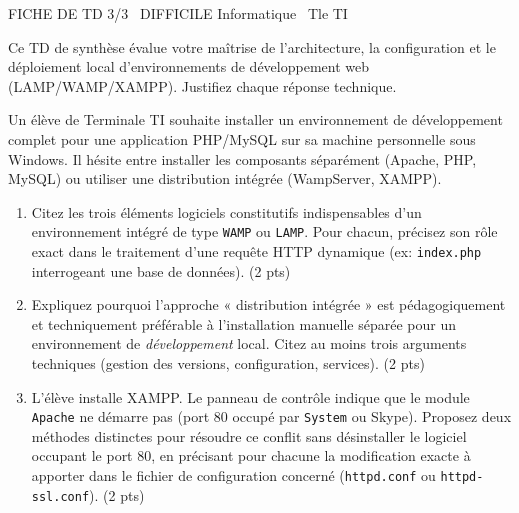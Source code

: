 \documentclass[11pt]{article}
\begin{document}
\begin{tcolorbox}[enhanced,colback=popink,colframe=popink,arc=10pt,boxrule=0pt,left=12pt,right=12pt,top=9pt,bottom=9pt]
{\color{white}\popxbold\small FICHE DE TD 3/3 \textbullet\ DIFFICILE \hfill Informatique \textbullet\ Tle TI\par}
\end{tcolorbox}
\vspace{4pt}
Ce TD de synthèse évalue votre maîtrise de l'architecture, la configuration et le déploiement local d'environnements de développement web (LAMP/WAMP/XAMPP). Justifiez chaque réponse technique.

\begin{exercice}
Un élève de Terminale TI souhaite installer un environnement de développement complet pour une application PHP/MySQL sur sa machine personnelle sous Windows. Il hésite entre installer les composants séparément (Apache, PHP, MySQL) ou utiliser une distribution intégrée (WampServer, XAMPP).

\begin{enumerate}
    \item Citez les trois éléments logiciels constitutifs indispensables d'un environnement intégré de type \texttt{WAMP} ou \texttt{LAMP}. Pour chacun, précisez son rôle exact dans le traitement d'une requête HTTP dynamique (ex: \texttt{index.php} interrogeant une base de données). (2 pts)
    \item Expliquez pourquoi l'approche « distribution intégrée » est pédagogiquement et techniquement préférable à l'installation manuelle séparée pour un environnement de \textit{développement} local. Citez au moins trois arguments techniques (gestion des versions, configuration, services). (2 pts)
    \item L'élève installe XAMPP. Le panneau de contrôle indique que le module \texttt{Apache} ne démarre pas (port 80 occupé par \texttt{System} ou Skype). Proposez deux méthodes distinctes pour résoudre ce conflit sans désinstaller le logiciel occupant le port 80, en précisant pour chacune la modification exacte à apporter dans le fichier de configuration concerné (\texttt{httpd.conf} ou \texttt{httpd-ssl.conf}). (2 pts)
\end{enumerate}
\end{exercice}
\end{document}
